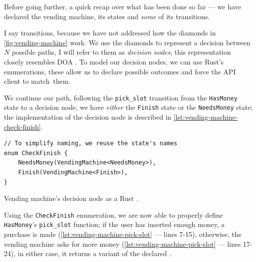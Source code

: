 Before going further, a quick recap over what has been done so far ---
we have declared the vending machine, its states and \emph{some} of its transitions.

I say  transitions, because we have not addressed how the diamonds in \autoref{fig:vending-machine} work.
We use the diamonds to represent a decision between $N$ possible paths, I will refer to them as \emph{decision nodes};
this representation closely resembles \gls{DOA} \cite{Trindade2020}.
To model our decision nodes, we can use Rust's enumerations,
these allow us to declare possible outcomes and force the \gls{API} client to match~them.

We continue our path, following the \texttt{pick\_slot} transition from the \textcolor{structblue}{\texttt{HasMoney}} state to a decision node,
we have \emph{either} the \textcolor{structblue}{\texttt{Finish}} state or the \textcolor{structblue}{\texttt{NeedsMoney}} state;
the implementation of the decision node is described in \autoref{lst:vending-machine-check-finish}.

\begin{listing}
    \begin{verbatim}
// To simplify naming, we reuse the state's names
enum CheckFinish {
    NeedsMoney(VendingMachine<NeedsMoney>),
    Finish(VendingMachine<Finish>),
}
\end{verbatim}
    \caption{Vending machine's decision node as a Rust .}
    \label{lst:vending-machine-check-finish}
\end{listing}

Using the \textcolor{structblue}{\texttt{CheckFinish}} enumeration, we are now able to properly define \textcolor{structblue}{\texttt{HasMoney}}'s \texttt{pick\_slot} function;
if the user has inserted enough money, a purchase is made (\autoref{lst:vending-machine-pick-slot} --- lines 7-15),
otherwise, the vending machine asks for more money (\autoref{lst:vending-machine-pick-slot} --- lines 17-24),
in either case, it returns a variant of the declared .

